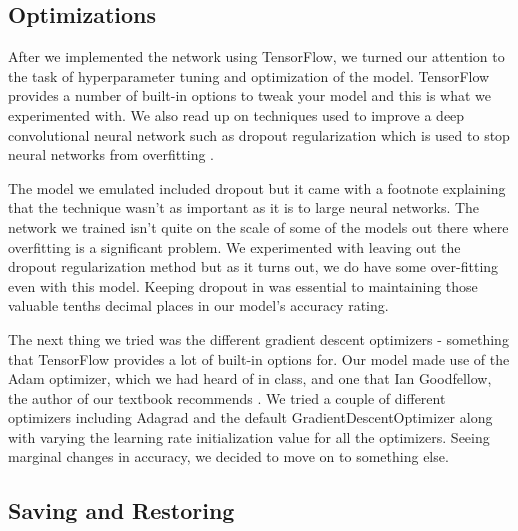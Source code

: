 \documentclass{article}
\begin{document}


\subsection{Optimizations}

After we implemented the network using TensorFlow, we turned our attention to the task of hyperparameter tuning and optimization of the model. TensorFlow provides a number of built-in options to tweak your model and this is what we experimented with. We also read up on techniques used to improve a deep convolutional neural network such as dropout regularization which is used to stop neural networks from overfitting \cite{srivastava2014dropout}.

The model we emulated included dropout but it came with a footnote explaining that the technique wasn't as important as it is to large neural networks. The network we trained isn't quite on the scale of some of the models out there where overfitting is a significant problem. We experimented with leaving out the dropout regularization method but as it turns out, we do have some over-fitting even with this model. Keeping dropout in was essential to maintaining those valuable tenths decimal places in our model's accuracy rating.

The next thing we tried was the different gradient descent optimizers - something that TensorFlow provides a lot of built-in options for. Our model made use of the Adam optimizer, which we had heard of in class, and one that Ian Goodfellow, the author of our textbook recommends \cite{goodfellow2016nips}. We tried a couple of different optimizers including Adagrad and the default GradientDescentOptimizer along with varying the learning rate initialization value for all the optimizers. Seeing marginal changes in accuracy, we decided to move on to something else.

\subsection{Saving and Restoring}
\end{document}
